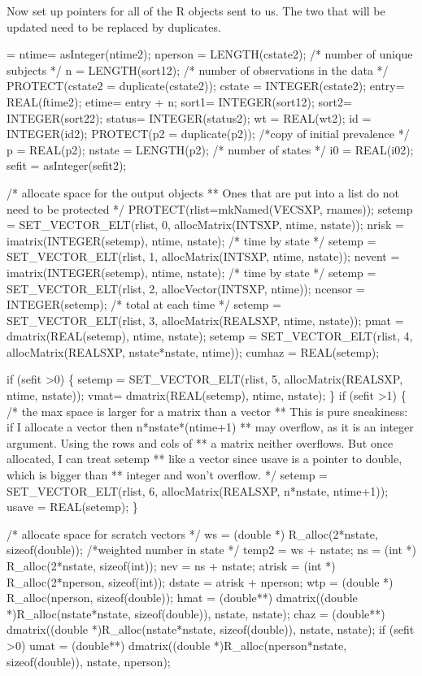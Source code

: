 \documentclass{article}
\begin{document}
Now set up pointers for all of the R objects sent to us.
The two that will be updated need to be replaced by duplicates.
\begin{nwchunk}
=
 ntime= asInteger(ntime2);
 nperson = LENGTH(cstate2); /* number of unique subjects */
 n   = LENGTH(sort12);    /* number of observations in the data */
 PROTECT(cstate2 = duplicate(cstate2));
 cstate  = INTEGER(cstate2);
 entry= REAL(ftime2);
 etime= entry + n;
 sort1= INTEGER(sort12);
 sort2= INTEGER(sort22);
 status= INTEGER(status2);
 wt = REAL(wt2);
 id = INTEGER(id2);
 PROTECT(p2 = duplicate(p2));  /*copy of initial prevalence */
 p = REAL(p2);
 nstate = LENGTH(p2);  /* number of states */
 i0 = REAL(i02);
 sefit = asInteger(sefit2);
 
 /* allocate space for the output objects
 ** Ones that are put into a list do not need to be protected
 */
 PROTECT(rlist=mkNamed(VECSXP, rnames));
 setemp = SET_VECTOR_ELT(rlist, 0, allocMatrix(INTSXP, ntime, nstate));
 nrisk =  imatrix(INTEGER(setemp), ntime, nstate);  /* time by state */
 setemp = SET_VECTOR_ELT(rlist, 1, allocMatrix(INTSXP, ntime, nstate));
 nevent = imatrix(INTEGER(setemp), ntime, nstate);  /* time by state */
 setemp = SET_VECTOR_ELT(rlist, 2, allocVector(INTSXP, ntime));
 ncensor = INTEGER(setemp);  /* total at each time */
 setemp  = SET_VECTOR_ELT(rlist, 3, allocMatrix(REALSXP, ntime, nstate));
 pmat =   dmatrix(REAL(setemp), ntime, nstate);
 setemp = SET_VECTOR_ELT(rlist, 4, allocMatrix(REALSXP, nstate*nstate, ntime));
 cumhaz = REAL(setemp);
 
 if (sefit >0) \{
     setemp = SET_VECTOR_ELT(rlist, 5,  allocMatrix(REALSXP, ntime, nstate));
     vmat= dmatrix(REAL(setemp), ntime, nstate);
 \}
 if (sefit >1) \{
     /* the max space is larger for a matrix than a vector 
     **  This is pure sneakiness: if I allocate a vector then n*nstate*(ntime+1)
     **  may overflow, as it is an integer argument.  Using the rows and cols of
     **  a matrix neither overflows.  But once allocated, I can treat setemp
     **  like a vector since usave is a pointer to double, which is bigger than
     **  integer and won't overflow. */
     setemp = SET_VECTOR_ELT(rlist, 6, allocMatrix(REALSXP, n*nstate, ntime+1));
     usave = REAL(setemp);
 \}
 
 /* allocate space for scratch vectors */
 ws = (double *) R_alloc(2*nstate, sizeof(double)); /*weighted number in state */
 temp2 = ws + nstate;
 ns    = (int *) R_alloc(2*nstate, sizeof(int));
 nev   = ns + nstate;
 atrisk = (int *) R_alloc(2*nperson, sizeof(int));
 dstate = atrisk + nperson;
 wtp = (double *) R_alloc(nperson, sizeof(double));
 hmat = (double**) dmatrix((double *)R_alloc(nstate*nstate, sizeof(double)),
                            nstate, nstate);
 chaz = (double**) dmatrix((double *)R_alloc(nstate*nstate, sizeof(double)),
                            nstate, nstate);
 if (sefit >0)  
     umat = (double**) dmatrix((double *)R_alloc(nperson*nstate, sizeof(double)),
                            nstate, nperson);
 

\end{nwchunk}
\end{document}

